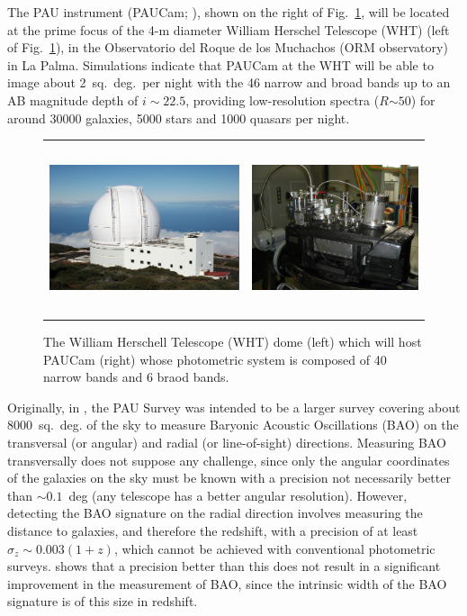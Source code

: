 The PAU instrument (PAUCam; \citet{Castander2012}), shown on the right of Fig.~\ref{fig:pau_survey}, will be located at the prime focus of the 4-m diameter William Herschel Telescope (WHT) (left of Fig.~\ref{fig:pau_survey}), in the Observatorio del Roque de los Muchachos (ORM observatory) in La Palma. Simulations indicate that PAUCam at the WHT will be able to image about 2~sq.~deg.~per night with the 46 narrow and broad bands up to an AB magnitude depth of $i\sim22.5$, providing low-resolution spectra ($R$$\sim50$) for around 30000 galaxies, 5000 stars and 1000 quasars per night.
\begin{figure}
\centering
\begin{tabular}{rl}
\includegraphics[height=50mm]{./plots/pau_telescope.jpg} & \includegraphics[height=50mm]{./plots/paucam.jpg}
\end{tabular}
\caption{The William Herschell Telescope (WHT) dome (left) which will host PAUCam (right) whose photometric system is composed of 40 narrow bands and 6 braod bands.}
\label{fig:pau_survey}
\end{figure}

Originally, in \citet{Benitez2009}, the PAU Survey was intended to be a larger survey covering about 8000~sq.~deg. of the sky to measure Baryonic Acoustic Oscillations (BAO) on the transversal (or angular) and radial (or line-of-sight) directions. Measuring BAO transversally does not suppose any challenge, since only the angular coordinates of the galaxies on the sky must be known with a precision not necessarily better than $\sim0.1$~deg (any telescope has a better angular resolution). However, detecting the BAO signature on the radial direction involves measuring the distance to galaxies, and therefore the redshift, with a precision of at least $\sigma_z \sim 0.003(1+z)$, which cannot be achieved with conventional photometric surveys. \citet{Benitez2009} shows that a precision better than this does not result in a significant improvement in the measurement of BAO, since the intrinsic width of the BAO signature is of this size in redshift.

